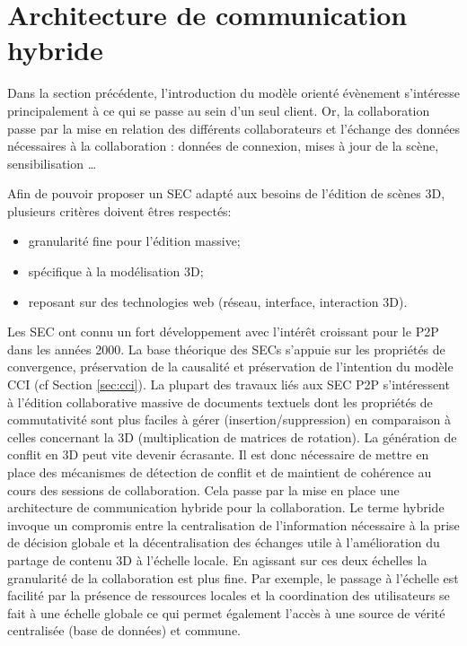\section{Architecture de communication hybride}


Dans la section précédente, l'introduction du modèle orienté évènement s'intéresse 
principalement à ce qui se passe au sein d'un seul client. Or, la collaboration 
passe par la mise en relation des différents collaborateurs et l'échange des 
données nécessaires à la collaboration : données de connexion, mises à jour de la 
scène, sensibilisation \dots 

Afin de pouvoir proposer un \gls{SEC} adapté aux besoins de l'édition de scènes 
3D, plusieurs critères doivent êtres respectés: 
\begin{itemize}
	\item granularité fine pour l'édition massive;
	\item spécifique à la modélisation 3D;
	\item reposant sur des technologies web (réseau, interface, interaction 3D).
\end{itemize}

Les \gls{SEC} ont connu un fort développement avec l'intérêt croissant 
pour le \gls{P2P} dans les années 2000. 
La base théorique des \glspl{SEC} s'appuie sur les propriétés de 
convergence, préservation de la 
causalité et préservation de l'intention du modèle \acrshort{CCI} 
\cite{Sun1998} (cf Section \ref{sec:cci}). 
La plupart des travaux liés aux \gls{SEC} \gls{P2P} s'intéressent à 
l'édition collaborative massive de documents textuels dont les propriétés 
de commutativité sont plus faciles à gérer (insertion/suppression) en 
comparaison à celles concernant la 3D (multiplication de matrices de 
rotation). La génération de conflit en 3D peut vite devenir écrasante. Il est 
donc nécessaire de mettre en place des mécanismes de détection de 
conflit et de maintient de cohérence au cours des sessions de 
collaboration. 
Cela passe par la mise en place une architecture de communication 
hybride pour la collaboration. 
Le terme \og hybride\fg{} invoque un compromis entre la 
centralisation de l'information nécessaire à la prise de décision globale et 
la décentralisation des échanges utile à l'amélioration du partage de 
contenu 3D à l'échelle locale. 
En agissant sur ces deux échelles la granularité de la collaboration est plus fine. 
Par exemple, le passage à l'échelle est facilité par la présence de 
ressources locales et la coordination des utilisateurs se fait à une échelle 
globale ce qui permet également l'accès à une source de vérité 
centralisée (base de données) et commune.

